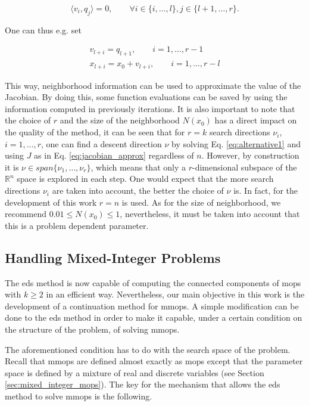 \begin{equation}
\langle v_i, q_j \rangle = 0, \qquad \forall i \in \{ i, \ldots, l \}, j \in \{ l+1, \ldots, r \}.
\label{eq:neigh_samples}
\end{equation} 

One can thus e.g. set

\begin{eqnarray}
v_{l+i} = q_{l+1}, \qquad i = 1, \ldots, r-1\\
x_{l+i} = x_0 + v_{l+i}, \qquad i = 1, \ldots, r-l
\label{eq:neigh_samples2}
\end{eqnarray}

This way, neighborhood information can be used to approximate the value of the Jacobian. By doing this, some function evaluations can be saved by using the information computed in previously iterations. It is also important to note that the choice of $r$ and the size of the neighborhood $N(x_0)$ has a direct impact on the quality of the method, it can be seen that for $r = k$ search directions $\nu_i$, $i = 1, \ldots, r$, one can find a descent direction $\nu$ by solving Eq. \eqref{eq:alternative1} and using $J$ as in Eq. \eqref{eq:jacobian_approx} regardless of $n$. However, by construction it is $\nu \in span\{\nu_1,\ldots,\nu_r\}$, which means that only a $r$-dimensional subspace of the $\mathbb{R}^n$ space is explored in each step. One would expect that the more search directions $\nu_i$ are taken into account, the better the choice of $\nu$ is. In fact, for the development of this work $r = n$ is used. As for the size of neighborhood, we recommend $0.01 \leq N(x_0) \leq 1$, nevertheless, it must be taken into account that this is a problem dependent parameter.

\subsection{Handling Mixed-Integer Problems}
\label{sec:handling_mips}

The \gls{eds} method is now capable of computing the connected components of \glspl{mop} with $k \geq 2$ in an efficient way. Nevertheless, our main objective in this work is the development of a continuation method for \glspl{mmop}. A simple modification can be done to the \gls{eds} method in order to make it capable, under a certain condition on the structure of the problem, of solving \glspl{mmop}.

The aforementioned condition has to do with the search space of the problem. Recall that \glspl{mmop} are defined almost exactly as \glspl{mop} except that the parameter space is defined by a mixture of real and discrete variables (see Section \ref{sec:mixed_integer_mops}). The key for the mechanism that allows the \gls{eds} method to solve \glspl{mmop} is the following.

